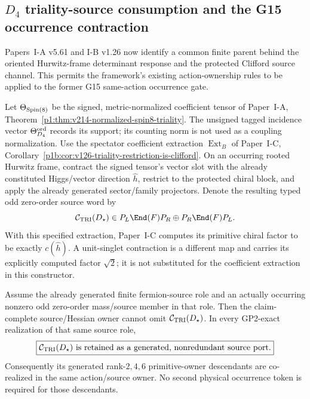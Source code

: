 \documentclass[12pt,a4paper]{article}
\begin{document}
\subsection{\texorpdfstring{\(D_4\)}{D4} triality-source consumption and the G15 occurrence contraction}
\label{p5:sec:v375-d4-triality-source-consumption}

Papers~I-A v5.61 and I-B v1.26 now identify a common finite parent behind the
oriented Hurwitz-frame determinant response and the protected Clifford source
channel.  This permits the framework's existing action-ownership rules to be
applied to the former G15 same-action occurrence gate.

\begin{definition}
\label{p5:def:v375-rooted-d4-triality-mass-source}
Let $\Theta_{\rm Spin(8)}$ be the signed, metric-normalized coefficient
tensor of Paper~I-A, Theorem~\ref{p1:thm:v214-normalized-spin8-triality}.
The unsigned tagged incidence vector $\Theta_{D_4}^{\rm ord}$ records its
support; its counting norm is not used as a coupling normalization.
Use the spectator coefficient extraction $\operatorname{Ext}_B$ of
Paper~I-C, Corollary~\ref{p1b:cor:v126-triality-restriction-is-clifford}.
On an occurring rooted Hurwitz frame, contract the signed tensor's
vector slot with the already constituted Higgs/vector direction \(\hat h\),
restrict to the protected chiral block, and apply the already generated
sector/family projectors.  Denote the resulting typed odd zero-order source
word by
\[
 \mathcal C_{\rm TRI}(D_\star)
 \in P_L\End(F)P_R\oplus P_R\End(F)P_L.
\]
With this specified extraction, Paper~I-C computes its primitive chiral
factor to be exactly $c(\hat h)$. A unit-singlet contraction is a different
map and carries its explicitly computed factor $\sqrt2$; it is not substituted
for the coefficient extraction in this constructor.
\end{definition}

\begin{theorem}
\label{p5:thm:v375-d4-triality-source-consumption}
Assume the already generated finite fermion-source role and an actually
occurring nonzero odd zero-order mass/source member in that role.  Then the
claim-complete source/Hessian owner cannot omit
\(\mathcal C_{\rm TRI}(D_\star)\).  In every GP2-exact realization of that same
source role,
\[
 \boxed{\mathcal C_{\rm TRI}(D_\star)\text{ is retained as a generated,
 nonredundant source port}.}
\]
Consequently its generated rank-\(2,4,6\) primitive-owner descendants are
co-realized in the same action/source owner.  No second physical occurrence
token is required for those descendants.
\end{theorem}
\end{document}
